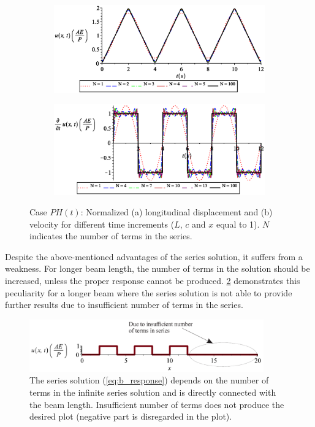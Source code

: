 \documentclass{article}
\begin{document}
\begin{figure}[H]
        \begin{subfigure}{1\textwidth}
            \includegraphics[width=0.9\columnwidth]{figures/c_u_diff_time_inc.eps} 
            \caption{}
        \end{subfigure}
        \begin{subfigure}{1\textwidth}
            \includegraphics[width=0.9\columnwidth]{figures/c_dudt_diff_time_inc.eps} 
            \caption{}
        \end{subfigure}
    \caption{Case $P H(t)$: Normalized (a) longitudinal displacement and (b) velocity for different time increments ($L$, $c$ and $x$ equal to 1). $N$ indicates the number of terms in the series.}
    \label{fig:c_diff_time_inc}
\end{figure}

Despite the above-mentioned advantages of the series solution, it suffers from a weakness. For longer beam length, the number of terms in the solution should be increased, unless the proper response cannot be produced. \cref{fig:series_sol_weakness} demonstrates this peculiarity for a longer beam where the series solution is not able to provide further results due to insufficient number of terms in the series. 
\begin{figure}[H]
    \centering
    \includegraphics[width = 0.9\textwidth ]{figures/b_u_diff_time_inc_weakness.pdf}
    \caption{The series solution (\cref{eq:b_response}) depends on the number of terms in the infinite series solution and is directly connected with the beam length. Insufficient number of terms does not produce the desired plot (negative part is disregarded in the plot).}
    \label{fig:series_sol_weakness}
\end{figure}




\newpage


\end{document}

